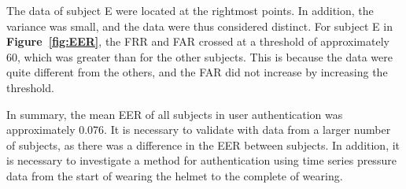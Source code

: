 \documentclass[sigchi,authordraft]{acmart}
\newcommand\figref[1]{\textbf{Figure~\ref{fig:#1}}}
\newcommand\tabref[1]{\textbf{Table~\ref{tab:#1}}}
\begin{document}
The data of subject E were located at the rightmost points. In addition, the variance was small, and the data were thus considered distinct. For subject E in \figref{EER}, the FRR and FAR crossed at a threshold of approximately 60, which was greater than for the other subjects. This is because the data were quite different from the others, and the FAR did not increase by increasing the threshold.\par

In summary, the mean EER of all subjects in user authentication was approximately 0.076. It is necessary to validate with data from a larger number of subjects, as there was a difference in the EER between subjects. In addition, it is necessary to investigate a method for authentication using time series pressure data from the start of wearing the helmet to the complete of wearing.




\end{document}
